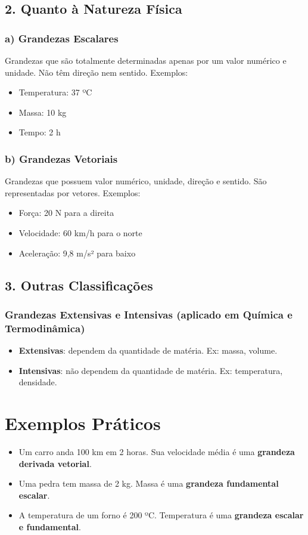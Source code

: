 \documentclass[portuguese,11pt,a4paper,oneside,onecolumn,notitlepage]{article}
\begin{document}
	\subsection{2. Quanto à Natureza Física}
	
	\subsubsection*{a) Grandezas Escalares}
	Grandezas que são totalmente determinadas apenas por um valor numérico e unidade. Não têm direção nem sentido. Exemplos:
	\begin{itemize}
		\item Temperatura: 37 ºC
		\item Massa: 10 kg
		\item Tempo: 2 h
	\end{itemize}
	
	\subsubsection*{b) Grandezas Vetoriais}
	Grandezas que possuem valor numérico, unidade, direção e sentido. São representadas por vetores. Exemplos:
	\begin{itemize}
		\item Força: 20 N para a direita
		\item Velocidade: 60 km/h para o norte
		\item Aceleração: 9{,}8 m/s² para baixo
	\end{itemize}
	
	\subsection{3. Outras Classificações}
	
	\subsubsection*{Grandezas Extensivas e Intensivas (aplicado em Química e Termodinâmica)}
	\begin{itemize}
		\item \textbf{Extensivas}: dependem da quantidade de matéria. Ex: massa, volume.
		\item \textbf{Intensivas}: não dependem da quantidade de matéria. Ex: temperatura, densidade.
	\end{itemize}
	
	\section{Exemplos Práticos}
	\begin{itemize}
		\item Um carro anda 100 km em 2 horas. Sua velocidade média é uma \textbf{grandeza derivada vetorial}.
		\item Uma pedra tem massa de 2 kg. Massa é uma \textbf{grandeza fundamental escalar}.
		\item A temperatura de um forno é 200 ºC. Temperatura é uma \textbf{grandeza escalar e fundamental}.
	\end{itemize}
	
\end{document}
